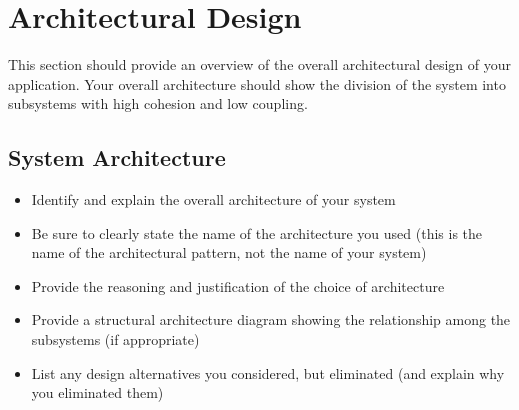\documentclass[]{article}
\begin{document}


\section{Architectural Design}
\label{sec:architectural_design}
This section should provide an overview of the overall architectural design of your application. Your overall architecture should show the division of the system into subsystems with high cohesion and low coupling.

\subsection{System Architecture}
\label{sub:system_architecture}
\begin{itemize}
	\item Identify and explain the overall architecture of your system
	\item Be sure to clearly state the name of the architecture you used (this is the name of the architectural pattern, not the name of your system)
	\item Provide the reasoning and justification of the choice of architecture
	\item Provide a structural architecture diagram showing the relationship among the subsystems (if appropriate)
	\item List any design alternatives you considered, but eliminated (and explain why you eliminated them)
\end{itemize}
\end{document}
